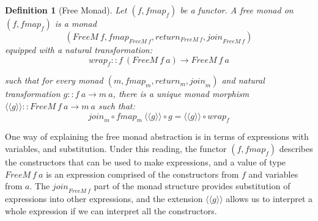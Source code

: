 \documentclass{jfp1}
\newcommand{\fmext}[1]{\langle\langle #1 \rangle\rangle}
\newtheorem{definition}{Definition}
\begin{document}
\begin{definition}[Free Monad]
  Let $(f, \mathit{fmap}_f)$ be a functor. A \emph{free monad} on
  $(f,\mathit{fmap}_f)$ is a monad
  \begin{displaymath}
    (\mathit{FreeM}~f, \mathit{fmap}_{\mathit{FreeM}~f}, \mathit{return}_{\mathit{FreeM}~f}, \mathit{join}_{\mathit{FreeM}~f})
  \end{displaymath}
  equipped with a natural transformation:
  \begin{displaymath}
    \mathit{wrap}_f :: f~(\mathit{FreeM}~f~a) \to \mathit{FreeM}~f~a
  \end{displaymath}

  such that for every monad $(m,
  \mathit{fmap}_m, \mathit{return_m}, \mathit{join}_m)$ and natural
  transformation $g :: f~a \to m~a$, there is a unique monad morphism
  $\fmext{g} :: \mathit{FreeM}~f~a \to m~a$ such that:
  \begin{displaymath}
    \mathit{join}_m \circ \mathit{fmap}_m~\fmext{g} \circ g = \fmext{g} \circ \mathit{wrap}_f
  \end{displaymath}
\end{definition}

One way of explaining the free monad abstraction is in terms of
expressions with variables, and substitution. Under this reading, the
functor $(f,\mathit{fmap}_f)$ describes the constructors that can be
used to make expressions, and a value of type $\mathit{FreeM}~f~a$ is
an expression comprised of the constructors from $f$ and variables
from $a$. The $\mathit{join}_{\mathit{FreeM}~f}$ part of the monad
structure provides substitution of expressions into other expressions,
and the extension $\fmext{g}$ allows us to interpret a whole
expression if we can interpret all the constructors.
\end{document}
